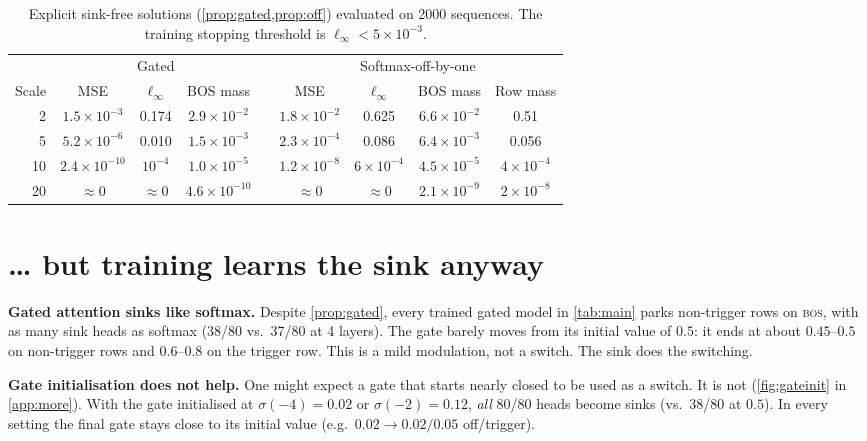 \documentclass{article} %
\newcommand{\bos}{\textsc{bos}}
\begin{document}
\begin{table}[t]
\caption{Explicit sink-free solutions (\cref{prop:gated,prop:off}) evaluated on 2000 sequences.
The training stopping threshold is $\ell_\infty<5\times10^{-3}$.}
\label{tab:constr}
\centering
\small
\begin{tabular}{rcccccccc}
\toprule
 & \multicolumn{3}{c}{Gated} & & \multicolumn{4}{c}{Softmax-off-by-one} \\
\cmidrule{2-4}\cmidrule{6-9}
Scale & MSE & $\ell_\infty$ & BOS mass & & MSE & $\ell_\infty$ & BOS mass & Row mass \\
\midrule
2  & $1.5\!\times\!10^{-3}$ & 0.174 & $2.9\!\times\!10^{-2}$ & & $1.8\!\times\!10^{-2}$ & 0.625 & $6.6\!\times\!10^{-2}$ & 0.51 \\
5  & $5.2\!\times\!10^{-6}$ & 0.010 & $1.5\!\times\!10^{-3}$ & & $2.3\!\times\!10^{-4}$ & 0.086 & $6.4\!\times\!10^{-3}$ & 0.056 \\
10 & $2.4\!\times\!10^{-10}$ & $10^{-4}$ & $1.0\!\times\!10^{-5}$ & & $1.2\!\times\!10^{-8}$ & $6\!\times\!10^{-4}$ & $4.5\!\times\!10^{-5}$ & $4\!\times\!10^{-4}$ \\
20 & $\approx0$ & $\approx0$ & $4.6\!\times\!10^{-10}$ & & $\approx0$ & $\approx0$ & $2.1\!\times\!10^{-9}$ & $2\!\times\!10^{-8}$ \\
\bottomrule
\end{tabular}
\end{table}

\section{\dots{} but training learns the sink anyway}
\label{sec:learned}
\textbf{Gated attention sinks like softmax.} Despite \cref{prop:gated}, every trained gated model in
\cref{tab:main} parks non-trigger rows on \bos{}, with as many sink heads as softmax (38/80 vs.\ 37/80 at
4 layers). The gate barely moves from its initial value of $0.5$: it ends at about $0.45$--$0.5$ on
non-trigger rows and $0.6$--$0.8$ on the trigger row. This is a mild modulation, not a switch. The sink
does the switching.

\textbf{Gate initialisation does not help.} One might expect a gate that starts nearly closed to be used as a
switch. It is not (\cref{fig:gateinit} in \cref{app:more}). With the gate initialised at $\sigma(-4)=0.02$
or $\sigma(-2)=0.12$, \emph{all} 80/80 heads become sinks (vs.\ 38/80 at $0.5$). In every setting the
final gate stays close to its initial value (e.g.\ $0.02\to0.02/0.05$ off/trigger).
\end{document}

